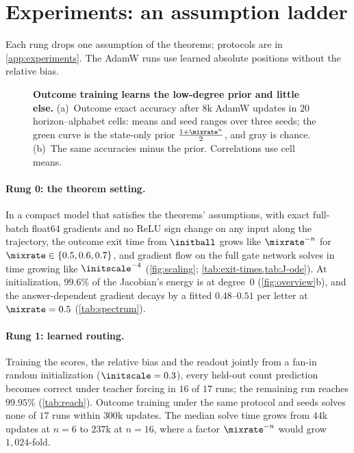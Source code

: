 \suppressfloats[t]
\section{Experiments: an assumption ladder}
\label{sec:experiments}
\label{sec:validation}

Each rung drops one assumption of the theorems; protocols are in \cref{app:experiments}. The AdamW runs use learned absolute positions
without the relative bias.

\begin{figure}[t]
\centering
\resizebox{\linewidth}{!}{}
\caption{\textbf{Outcome training learns the low-degree prior and little else.}
(a)~Outcome exact accuracy after $8$k AdamW updates in $20$ horizon--alphabet cells: means and seed ranges over three seeds; the green curve is the state-only prior $\frac{1+\mixrate^n}{2}$, and gray is chance.
(b)~The same accuracies minus the prior. Correlations use cell means.}
\label{fig:theory-measurement}
\label{fig:lambda-grid}
\end{figure}

\paragraph{Rung 0: the theorem setting.} In a compact model that satisfies the theorems' assumptions, with exact full-batch float64
gradients and no ReLU sign change on any input along the trajectory, the outcome exit time from $\initball$ grows like $\mixrate^{-n}$ for
$\mixrate\in\{0.5,0.6,0.7\}$, and gradient flow on the full gate network solves in time growing like
$\initscale^{-4}$ (\cref{fig:scaling}; \cref{tab:exit-times,tab:J-ode}).
At initialization, $99.6\%$ of the Jacobian's energy is at degree~$0$ (\cref{fig:overview}b), and the answer-dependent gradient decays by a
fitted $0.48$--$0.51$ per letter at $\mixrate=0.5$ (\cref{tab:spectrum}).

\paragraph{Rung 1: learned routing.} Training the scores, the relative bias and the readout jointly from a fan-in random initialization
($\initscale=0.3$), every held-out count prediction becomes correct under teacher forcing in $16$ of $17$ runs; the remaining run reaches $99.95\%$
(\cref{tab:reach}). Outcome training under the same protocol and seeds solves none of $17$ runs within $300$k updates. The median solve
time grows from $44$k updates at $n=6$ to $237$k at $n=16$, where a factor $\mixrate^{-n}$ would grow $1{,}024$-fold.

